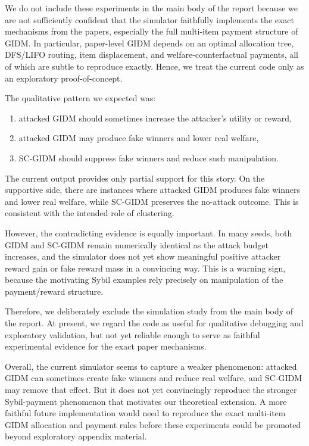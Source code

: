 \documentclass[sigconf]{aamas}
\theoremstyle{definition}
\theoremstyle{remark}
\begin{document}
We do not include these experiments in the main body of the report because we are not sufficiently confident that the simulator faithfully implements the exact mechanisms from the papers, especially the full multi-item payment structure of GIDM. In particular, paper-level GIDM depends on an optimal allocation tree, DFS/LIFO routing, item displacement, and welfare-counterfactual payments, all of which are subtle to reproduce exactly. Hence, we treat the current code only as an exploratory proof-of-concept.

The qualitative pattern we expected was:
\begin{enumerate}
    \item attacked GIDM should sometimes increase the attacker's utility or reward,
    \item attacked GIDM may produce fake winners and lower real welfare,
    \item SC-GIDM should suppress fake winners and reduce such manipulation.
\end{enumerate}

The current output provides only partial support for this story. On the supportive side, there are instances where attacked GIDM produces fake winners and lower real welfare, while SC-GIDM preserves the no-attack outcome. This is consistent with the intended role of clustering.

However, the contradicting evidence is equally important. In many seeds, both GIDM and SC-GIDM remain numerically identical as the attack budget increases, and the simulator does not yet show meaningful positive attacker reward gain or fake reward mass in a convincing way. This is a warning sign, because the motivating Sybil examples rely precisely on manipulation of the payment/reward structure.

Therefore, we deliberately exclude the simulation study from the main body of the report. At present, we regard the code as useful for qualitative debugging and exploratory validation, but not yet reliable enough to serve as faithful experimental evidence for the exact paper mechanisms.

Overall, the current simulator seems to capture a weaker phenomenon: attacked GIDM can sometimes create fake winners and reduce real welfare, and SC-GIDM may remove that effect. But it does not yet convincingly reproduce the stronger Sybil-payment phenomenon that motivates our theoretical extension. A more faithful future implementation would need to reproduce the exact multi-item GIDM allocation and payment rules before these experiments could be promoted beyond exploratory appendix material.

\balance


\end{document}
